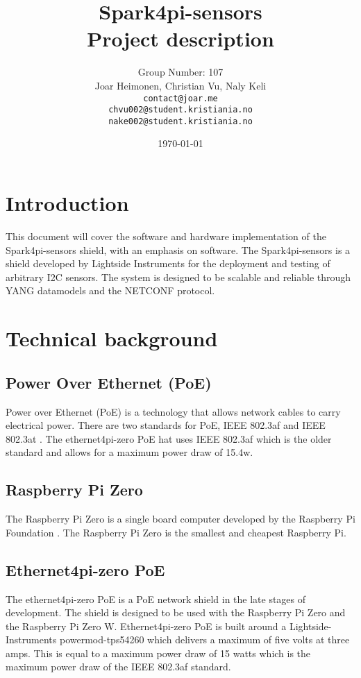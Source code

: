 \documentclass[12pt]{article}
\author{
    Group Number: 107\\
    Joar Heimonen, Christian Vu, Naly Keli \\
    \texttt{contact@joar.me}\\ 
    \texttt{chvu002@student.kristiania.no}\\
    \texttt{nake002@student.kristiania.no}
}
\title{
    \textbf{Spark4pi-sensors}\\[0.5em]
    \large Project description
}
\date{\today}
\begin{document}
\maketitle
\pagebreak

\tableofcontents

\pagebreak


\section{Introduction}
This document will cover the software and hardware implementation of the Spark4pi-sensors shield, with an emphasis
on software. The Spark4pi-sensors is a shield developed by Lightside Instruments for the deployment and testing of arbitrary I2C sensors.
The system is designed to be scalable and reliable through YANG datamodels and the NETCONF protocol.

\section{Technical background}
\subsection{Power Over Ethernet (PoE)}
Power over Ethernet (PoE) is a technology that allows network cables to carry electrical power. 
There are two standards for PoE, IEEE 802.3af and IEEE 802.3at \cite{IEEEStandardsAssociation}. 
The ethernet4pi-zero PoE hat uses IEEE 802.3af which 
is the older standard and allows for a maximum power draw of 15.4w.

\subsection{Raspberry Pi Zero}
The Raspberry Pi Zero is a single board computer developed by the Raspberry Pi Foundation \cite{foundationTeachLearnMake2025}. 
The Raspberry Pi Zero is the smallest and cheapest Raspberry Pi.

\subsection{Ethernet4pi-zero PoE}
The ethernet4pi-zero PoE is a PoE network shield in the late stages of development.
The shield is designed to be used with the Raspberry Pi Zero and the Raspberry Pi Zero W.
Ethernet4pi-zero PoE is built around a Lightside-Instruments powermod-tps54260 which delivers a maximum of five volts at three amps.
This is equal to a maximum power draw of 15 watts which is the maximum power draw of the IEEE 802.3af standard.
\end{document}
